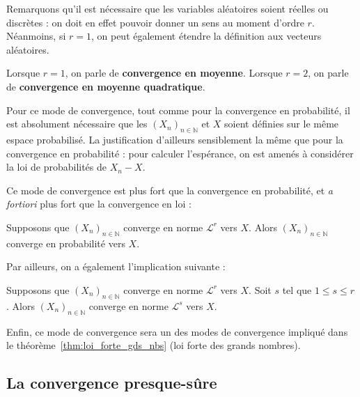 \documentclass[../integ-proba.tex]{subfiles}
\begin{document}
    \begin{rem}
        Remarquons qu'il est nécessaire que les variables aléatoires soient réelles ou discrètes : on doit en effet pouvoir donner un sens au moment d'ordre $r$.
        Néanmoins, si $r=1$, on peut également étendre la définition aux vecteurs aléatoires.
    \end{rem}

    \begin{rem}
        Lorsque $r=1$, on parle de \textbf{convergence en moyenne}.
        Lorsque $r=2$, on parle de \textbf{convergence en moyenne quadratique}.
    \end{rem}

    \begin{rem}
        Pour ce mode de convergence, tout comme pour la convergence en probabilité, il est absolument nécessaire que les $\left(X_n\right)_{n\in\mathbb{N}}$ et $X$ soient définies sur le même espace probabilisé.
        La justification d'ailleurs sensiblement la même que pour la convergence en probabilité : pour calculer l'espérance, on est amenés à considérer la loi de probabilités de $X_n - X$.
    \end{rem}

    Ce mode de convergence est plus fort que la convergence en probabilité, et \textit{a fortiori} plus fort que la convergence en loi :

    \begin{prop}
        Supposons que $\left(X_n\right)_{n\in\mathbb{N}}$ converge en norme $\mathcal{L}^r$ vers $X$.
        Alors $\left(X_n\right)_{n\in\mathbb{N}}$ converge en probabilité vers $X$.
    \end{prop}

    Par ailleurs, on a également l'implication suivante :

    \begin{prop}
        Supposons que $\left(X_n\right)_{n\in\mathbb{N}}$ converge en norme $\mathcal{L}^r$ vers $X$.
        Soit $s$ tel que $1 \leq s \leq r$.
        Alors $\left(X_n\right)_{n\in\mathbb{N}}$ converge en norme $\mathcal{L}^s$ vers $X$.
    \end{prop}

    \begin{rem}
        Enfin, ce mode de convergence sera un des modes de convergence impliqué dans le théorème~\ref{thm:loi_forte_gds_nbs} (loi forte des grands nombres).
    \end{rem}

    \subsection{La convergence presque-sûre}
\end{document}
